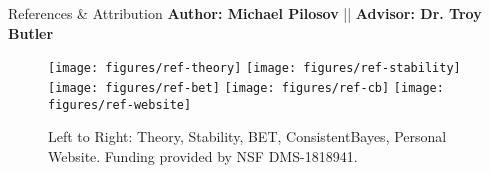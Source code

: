 \begin{block}{References \& Attribution}
    \centering
    \textbf{Author: Michael Pilosov} || \textbf{Advisor: Dr. Troy Butler}
    \begin{figure}
        \texttt{[image: figures/ref-theory]}
        \texttt{[image: figures/ref-stability]}
        \texttt{[image: figures/ref-bet]}
        \texttt{[image: figures/ref-cb]}
        \texttt{[image: figures/ref-website]}
    \caption{\centering Left to Right: Theory, Stability, BET, ConsistentBayes, Personal Website. \newline Funding provided by NSF DMS-1818941.}
    \end{figure}

\end{block}

